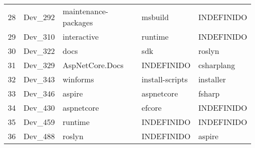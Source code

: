 \begin{tabular}{lllll}
28 & Dev_292 & maintenance-packages & msbuild & INDEFINIDO \\
29 & Dev_310 & interactive & runtime & INDEFINIDO \\
30 & Dev_322 & docs & sdk & roslyn \\
31 & Dev_329 & AspNetCore.Docs & INDEFINIDO & csharplang \\
32 & Dev_343 & winforms & install-scripts & installer \\
33 & Dev_346 & aspire & aspnetcore & fsharp \\
34 & Dev_430 & aspnetcore & efcore & INDEFINIDO \\
35 & Dev_459 & runtime & INDEFINIDO & INDEFINIDO \\
36 & Dev_488 & roslyn & INDEFINIDO & aspire \\
\end{tabular}
